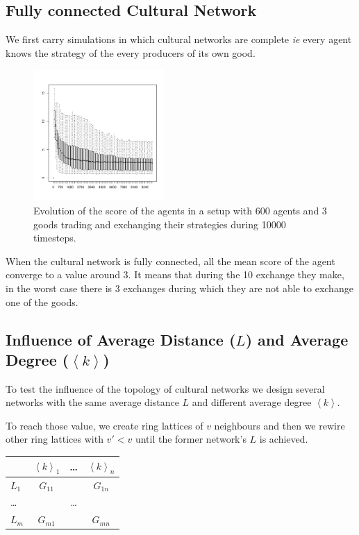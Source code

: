 \documentclass[a1paper,portrait,showframe,fontscale=.45]{baposter}
\begin{document}
\begin{poster}
{\begin{multicols}{2}
					\subsection*{Fully connected Cultural Network}
					We first carry simulations in which cultural networks are complete \emph{ie} every agent knows the strategy of the every producers of its own good. 					\begin{figure}[H]
						\centering
						\begin{multicols}{2}
							\includegraphics[width=5cm]{img/full.pdf} 
							\caption{Evolution of the score of the agents in a setup with 600 agents and 3 goods trading and exchanging their strategies during 10000 timesteps.}%
							\label{fig:scoreEvol}
						\end{multicols}
					\end{figure}
					\vspace{-1cm}
					When the cultural network is fully connected, all the mean score of the agent converge to a value around 3. It means that during the 10 exchange they make, in the worst case there is 3 exchanges during which they are not able to exchange one of the goods.
					\subsection*{Influence of Average Distance ($L$) and Average Degree ($\left\langle k\right\rangle$)}
					\begin{multicols}{2}
						To test the influence of the topology of cultural networks we design several networks with the same average distance $L$ and different average degree $\left\langle k\right\rangle$. 
						
						To reach those value, we create ring lattices of $v$ neighbours and then we rewire other ring lattices with $v'<v$ until the former network's $L$ is achieved.  
						\columnbreak
						\begin{center}
							\Large
							\begin{tabular}{l|ccc}
								& $\left\langle k\right\rangle_1$	 	& \dots & $\left\langle k\right\rangle_n$		\\\hline
								$L_1$	& $G_{11}$	& 	& $G_{1n}$	\\	
								\dots	&		&\dots	&		\\
								$L_m$	& $G_{m1}$	& 	& $G_{mn}$	\\	
							\end{tabular}
						\end{center}
					\end{multicols}


\end{multicols}}
\end{poster}
\end{document}

